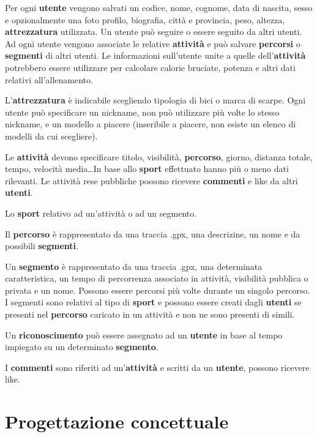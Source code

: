 \documentclass[12pt]{report}
\begin{document}
\vspace{12pt}

Per ogni \textbf{utente} vengono salvati un codice, nome, cognome, data di nascita, sesso e opzionalmente una foto profilo,
biografia, città e provincia, peso, altezza, \textbf{attrezzatura} utilizzata. Un utente può seguire o essere seguito 
da altri utenti. Ad ogni utente vengono associate le relative \textbf{attività} e può salvare \textbf{percorsi} o 
\textbf{segmenti} di altri utenti. Le informazioni sull'utente unite a quelle dell'\textbf{attività} potrebbero essere
utilizzare per calcolare calorie bruciate, potenza e altri dati relativi all'allenamento.

L'\textbf{attrezzatura} è indicabile scegliendo tipologia di bici o marca di scarpe. Ogni utente può specificare un nickname,
non può utilizzare più volte lo stesso nickname, e un modello a piacere (inseribile a piacere, non esiste un elenco 
di modelli da cui scegliere).

Le \textbf{attività} devono specificare titolo, visibilità, \textbf{percorso}, giorno, distanza totale,
tempo, velocità media\dots In base allo \textbf{sport} effettuato hanno più o meno dati rilevanti. Le attività rese pubbliche 
possono ricevere \textbf{commenti} e like da altri \textbf{utenti}.

Lo \textbf{sport} relativo ad un'attività o ad un segmento.

Il \textbf{percorso} è rappresentato da una traccia .gpx, una descrizine, un nome e da possibili \textbf{segmenti}.

Un \textbf{segmento} è rappresentato da una traccia .gpx, una determinata caratteristica, un tempo di
percorrenza associato in attività, visibilità pubblica o privata e un nome. Possono essere percorsi più volte durante un singolo
percorso. I segmenti sono relativi al tipo di \textbf{sport} e possono 
essere creati dagli \textbf{utenti} se presenti nel \textbf{percorso} caricato in un attività e non ne sono presenti 
di simili.

Un \textbf{riconoscimento} può essere assegnato ad un \textbf{utente} in base al tempo impiegato su un determinato 
\textbf{segmento}.

I \textbf{commenti} sono riferiti ad un'\textbf{attività} e scritti da un \textbf{utente}, possono ricevere like.

\chapter{Progettazione concettuale}
\end{document}
